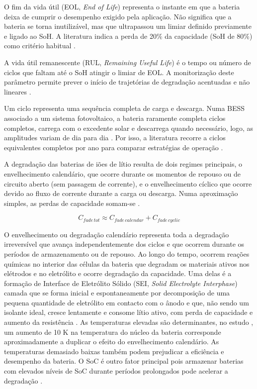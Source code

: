 O fim da vida útil (EOL, \textit{End of Life}) representa o instante em que a bateria deixa de cumprir o desempenho exigido pela aplicação. Não significa que a bateria se torna inutilizável, mas que ultrapassou um limiar definido previamente e ligado ao SoH. A literatura indica a perda de 20\% da capacidade (SoH de 80\%) como critério habitual \cite{ Wu2022}.

A vida útil remanescente (RUL, \textit{Remaining Useful Life}) é o tempo ou número de ciclos que faltam até o SoH atingir o limiar de EOL. A monitorização deste parâmetro permite prever o início de trajetórias de degradação acentuadas e não lineares \cite{Nazaralizadeh2024}. 

Um ciclo representa uma sequência completa de carga e descarga. Numa BESS associado a um sistema fotovoltaico, a bateria raramente completa ciclos completos, carrega com o excedente solar e descarrega quando necessário, logo, as amplitudes variam de dia para dia \cite{ Mishra2020}. Por isso, a literatura recorre a ciclos equivalentes completos por ano para comparar estratégias de operação \cite{ Azuatalam2019}. 

A degradação das baterias de iões de lítio resulta de dois regimes principais, o envelhecimento calendário, que ocorre durante os momentos de repouso ou de circuito aberto (sem passagem de corrente), e o envelhecimento cíclico que ocorre devido ao fluxo de corrente durante a carga ou descarga. Numa aproximação simples, as perdas de capacidade somam-se \cite{ Raj2020}\cite{ Hesse2017}. 



\[
C_{fade\,tot} \approx C_{fade\,calendar} + C_{fade\,cyclic}
\]

O envelhecimento ou degradação calendário representa toda a degradação irreversível que avança independentemente dos ciclos e que ocorrem durante os períodos de armazenamento ou de repouso. Ao longo do tempo, ocorrem reações químicas no interior das células da bateria que degradam os materiais ativos nos elétrodos e no eletrólito e ocorre degradação da capacidade. Uma delas é a formação de Interface de Eletrólito Sólido (SEI, \textit{Solid Electrolyte Interphase}) camada que se forma inicial e espontaneamente por decomposição de uma pequena quantidade de eletrólito em contacto com o ânodo e que, não sendo um isolante ideal, cresce lentamente e consome lítio ativo, com perda de capacidade e aumento da resistência \cite{ Hesse2017}\cite{ Yarimca2024}\cite{Asiri2025}. As temperaturas elevadas são determinantes, no estudo \cite{ Hesse2017}, um aumento de 10 K na temperatura do núcleo da bateria corresponde aproximadamente a duplicar o efeito do envelhecimento calendário. As temperaturas demasiado baixas também podem prejudicar a eficiência e desempenho da bateria. O SoC é outro fator principal pois armazenar baterias com elevados níveis de SoC durante períodos prolongados pode acelerar a degradação \cite{ Yarimca2024}\cite{Asiri2025}. 

